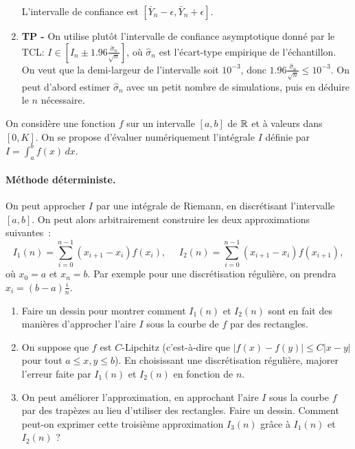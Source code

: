\documentclass[solutions]{exercices}
\begin{document}
\begin{solution}
\begin{enumerate}
  L'intervalle de confiance est $[\bar{Y}_n - \epsilon, \bar{Y}_n + \epsilon]$.
  \item \textbf{TP -} On utilise plutôt l'intervalle de confiance asymptotique donné par le TCL: $I \in [\hat{I}_n \pm 1.96 \frac{\hat{\sigma}_n}{\sqrt{n}}]$, où $\hat{\sigma}_n$ est l'écart-type empirique de l'échantillon. On veut que la demi-largeur de l'intervalle soit $10^{-3}$, donc $1.96 \frac{\hat{\sigma}_n}{\sqrt{n}} \leq 10^{-3}$. On peut d'abord estimer $\hat{\sigma}_n$ avec un petit nombre de simulations, puis en déduire le $n$ nécessaire.
\end{enumerate}
\end{solution}


\begin{exercice}
On consid\`ere une fonction $f$ sur un intervalle $[a,b]$ de $\mathbb{R}$
et \`a valeurs dans $[0,K]$. On se propose d'\'evaluer
num\'eriquement l'int\'egrale $I$ d\'efinie par
$I=\int_a^b f(x) \, dx.$

\paragraph{M\'ethode d\'eterministe.}
On peut  approcher $I$ par une int\'egrale de Riemann,
en discr\'etisant l'intervalle $[a,b]$. On peut alors
arbitrairement construire les deux approximations suivantes~:
$$
 I_1(n) = \sum_{i=0}^{n-1}(x_{i+1}-x_i)f(x_i), \ \ \ \ \ \
 I_2(n) = \sum_{i=0}^{n-1}(x_{i+1}-x_i)f(x_{i+1}),
$$
o\`u $x_0=a$ et $x_n=b$. Par exemple pour une discrétisation réguli\`ere, on prendra $x_i=(b-a)  \frac{i}{n}$.

 \begin{enumerate}
\item
Faire un dessin pour montrer comment $I_1(n)$ et $I_2(n)$ sont en fait des manières d'approcher l'aire $I$ sous la courbe de $f$ par des rectangles.
\item
On suppose que $f$ est $C$-Lipchitz (c'est-à-dire que $|f(x)-f(y)|\leq C |x-y|$ pour tout $a\leq x,y\leq b$). En choisissant une discr\'etisation r\'eguli\`ere,
majorer l'erreur faite par $I_1(n)$ et $I_2(n)$ en fonction de $n$.
\item On peut am\'eliorer
l'approximation, en approchant l'aire $I$ sous la courbe $f$ par des trapèzes au lieu d'utiliser des rectangles. Faire un dessin. Comment peut-on exprimer cette troisième approximation $I_3(n)$ grâce à  $I_1(n)$ et $I_2(n)$ ?
\end{enumerate}


\end{exercice}
\end{document}
